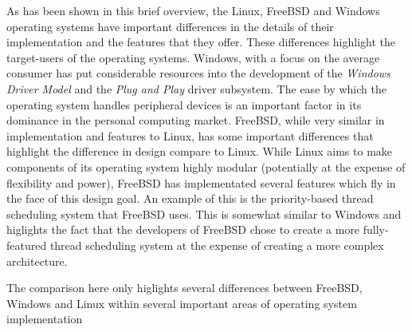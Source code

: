 As has been shown in this brief overview, the Linux, FreeBSD and Windows operating systems have important differences in the details of their implementation and the features that they offer.  These differences highlight the target-users of the operating systems.  Windows, with a focus on the average consumer has put considerable resources into the development of the \textit{Windows Driver Model} and the \textit{Plug and Play} driver subsystem.  The ease by which the operating system handles peripheral devices is an important factor in its dominance in the personal computing market.  FreeBSD, while very similar in implementation and features to Linux, has some important differences that highlight the difference in design compare to Linux.  While Linux aims to make components of its operating system highly modular (potentially at the expense of flexibility and power), FreeBSD has implementated several features which fly in the face of this design goal.  An example of this is the priority-based thread scheduling system that FreeBSD uses.  This is somewhat similar to Windows and higlights the fact that the developers of FreeBSD chose to create a more fully-featured thread scheduling system at the expense of creating a more complex architecture.

The comparison here only higlights  several differences between FreeBSD, Windows and Linux within several important areas of operating system implementation
